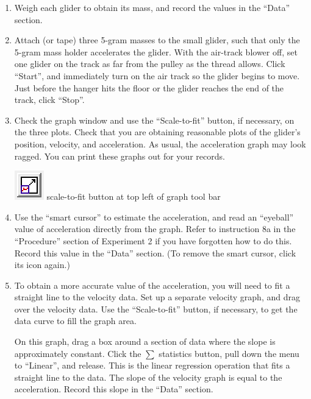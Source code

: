 \begin{enumerate}[label=\arabic*.]

\item Weigh each glider to obtain its mass, and record the values in the ``Data'' section.

\item Attach (or tape) three 5-gram masses to the small glider, such that only the 5-gram mass holder accelerates the glider.  
With the air-track blower off, set one glider on the track as far from the pulley as the thread allows.  Click ``Start'', and immediately turn on the air track so the glider begins to move.  Just before the hanger hits the floor or the glider reaches the end of the track, click ``Stop''.

\item Check the graph window and use the ``Scale-to-fit'' button, if necessary, on the three plots.  Check that you are obtaining reasonable plots of the glider's position, velocity, and acceleration.  As usual, the acceleration graph may look ragged.  You can print these graphs out for your records.

\includegraphics*{imgs/6labs/6Alab/6Aexp3/6A_exp3_ScaleToFit2.png} scale-to-fit button at top left of graph tool bar

\item Use the ``smart cursor'' to estimate the acceleration, and read an ``eyeball'' value of acceleration directly from the graph.  Refer to instruction 8a in the ``Procedure'' section of Experiment 2 if you have forgotten how to do this.  Record this value in the ``Data'' section.  (To remove the smart cursor, click its icon again.)

\item To obtain a more accurate value of the acceleration, you will need to fit a straight line to the velocity data.  Set up a separate velocity graph, and drag over the velocity data.  Use the ``Scale-to-fit'' button, if necessary, to get the data curve to fill the graph area.

On this graph, drag a box around a section of data where the slope is approximately constant.  Click the \(\sum\) statistics button, pull down the menu to ``Linear'', and release.  This is the linear regression operation that fits a straight line to the data.  The slope of the velocity graph is equal to the acceleration.  Record this slope in the ``Data'' section.


\end{enumerate}
